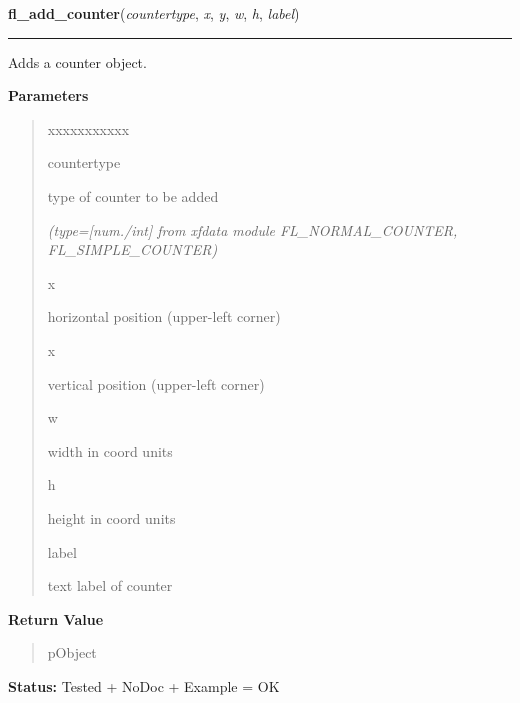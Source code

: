 \hspace{.8\funcindent}\begin{boxedminipage}{\funcwidth}

    \raggedright \textbf{fl\_add\_counter}(\textit{countertype}, \textit{x}, \textit{y}, \textit{w}, \textit{h}, \textit{label})

    \vspace{-1.5ex}

    \rule{\textwidth}{0.5\fboxrule}
\setlength{\parskip}{2ex}
    Adds a counter object.

\setlength{\parskip}{1ex}
      \textbf{Parameters}
      \vspace{-1ex}

      \begin{quote}
        \begin{Ventry}{xxxxxxxxxxx}

          \item[countertype]

          type of counter to be added

            {\it (type=[num./int] from xfdata module FL\_NORMAL\_COUNTER, FL\_SIMPLE\_COUNTER)}

          \item[x]

          horizontal position (upper-left corner)

          \item[x]

          vertical position (upper-left corner)

          \item[w]

          width in coord units

          \item[h]

          height in coord units

          \item[label]

          text label of counter

        \end{Ventry}

      \end{quote}

      \textbf{Return Value}
    \vspace{-1ex}

      \begin{quote}
      pObject

      \end{quote}

\textbf{Status:} Tested + NoDoc + Example = OK



    \end{boxedminipage}

